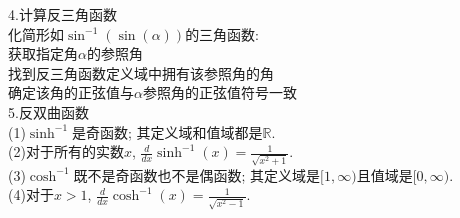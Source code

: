 \documentclass[UTF8, fontset=ubuntu]{ctexart}
\begin{document}
4.计算反三角函数\\
化简形如$\sin^{-1}(\sin(\alpha))$的三角函数:\\
\phantom{(1)}获取指定角$\alpha$的参照角\\
\phantom{(1)}找到反三角函数定义域中拥有该参照角的角\\
\phantom{(1)}确定该角的正弦值与$\alpha$参照角的正弦值符号一致\\[2ex]

5.反双曲函数\\
(1)$\sinh^{-1}$是奇函数; 其定义域和值域都是$\mathbb{R}$.\\[1ex]
(2)对于所有的实数$x$, $\displaystyle\frac{d}{dx}\sinh^{-1}(x)=\frac{1}{\sqrt{x^2+1}}$.\\[1ex]
(3)$\cosh^{-1}$既不是奇函数也不是偶函数; 其定义域是$[1,\infty)$且值域是$[0,\infty)$.\\[1ex]
(4)对于$x>1$, $\displaystyle\frac{d}{dx}\cosh^{-1}(x)=\frac{1}{\sqrt{x^2-1}}$.\\[1ex]
\end{document}
